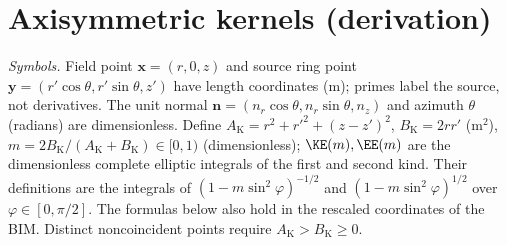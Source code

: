 \section{Axisymmetric kernels (derivation)}\label{app:kernels}
\emph{Symbols.} Field point $\mathbf x=(r,0,z)$ and source ring point
$\mathbf y=(r'\cos\theta,r'\sin\theta,z')$ have length coordinates (m); primes label the source,
not derivatives. The unit normal $\mathbf n=(n_r\cos\theta,n_r\sin\theta,n_z)$ and azimuth
$\theta$ (radians) are dimensionless.
Define $A_{\mathrm K}=r^2+r'^2+(z-z')^2$, $B_{\mathrm K}=2rr'$ (m$^2$),
$m=2B_{\mathrm K}/(A_{\mathrm K}+B_{\mathrm K})\in[0,1)$ (dimensionless);
$\KE(m),\EE(m)$ are the dimensionless complete elliptic integrals of the first and second kind.
Their definitions are the integrals of $(1-m\sin^2\varphi)^{-1/2}$ and
$(1-m\sin^2\varphi)^{1/2}$ over $\varphi\in[0,\pi/2]$.
The formulas below also hold in the rescaled coordinates of the BIM. Distinct noncoincident
points require $A_{\mathrm K}>B_{\mathrm K}\ge0$.

